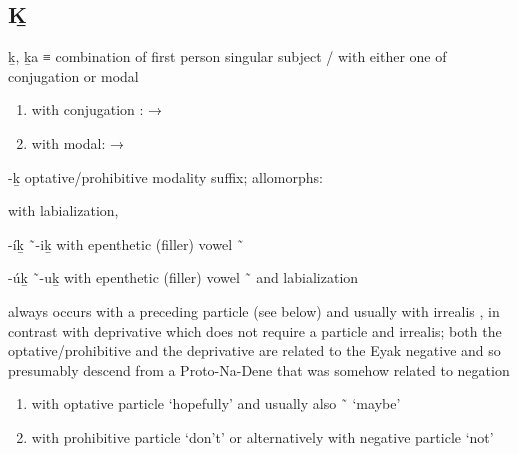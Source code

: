 
\subsection{Ḵ}\label{sec:alphalist-kh}
\begin{morphdesc}[resume*=alphalist]
\item[ḵ, ḵa]
	≡ 
	combination of first person singular subject  /  with either one of
		conjugation 
		or modal 
	\begin{enumerate}
	\item	with conjugation :  → 
	\item	with modal:  → 
	\end{enumerate}

\item[-ḵ]\label{m:-ḵ-optphib}
	optative/prohibitive modality suffix;
	\newline
	allomorphs:
	\begin{allolist}
	\item[{\X[-ḵw-optphib]{-ḵw}}]
		 	with labialization,
	\item[-íḵ \~\ -iḵ] with epenthetic (filler) vowel  \~\ 
	\item[-úḵ \~\ -uḵ] with epenthetic (filler) vowel  \~\  and labialization
	\end{allolist}
	always occurs with a preceding particle (see below) and usually with irrealis ,
	in contrast with deprivative  which does not require a particle and irrealis;
	both the optative/prohibitive and the deprivative are related to 
		the Eyak negative 
		and so presumably descend from a Proto-Na-Dene  
		that was somehow related to negation
		\parencites{leer:2000b}[872, 876]{crippen:2019}
	\begin{enumerate}
	\item	with optative particle  ‘hopefully’
			and usually also  \~\  ‘maybe’
	\item	with prohibitive particle  ‘don’t’
			or alternatively with negative particle  ‘not’
	\end{enumerate}


\end{morphdesc}
